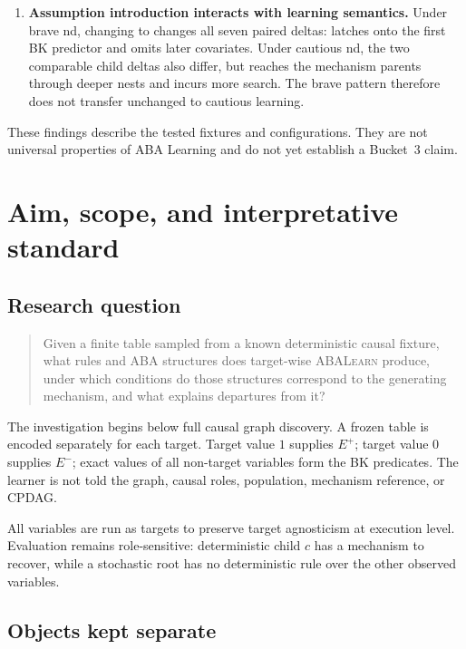\documentclass[11pt]{article}
\DeclareRobustCommand{\code}[1]{\texttt{\detokenize{#1}}}
\newcommand{\ABALearn}{\textsc{ABALearn}}
\newcommand{\Epos}{E^{+}}
\newcommand{\Eneg}{E^{-}}
\begin{document}
\begin{enumerate}
  \item \textbf{Assumption introduction interacts with learning semantics.}
  Under brave nd, changing \code{relto} to \code{sechk} changes all seven
  paired deltas: \code{sechk} latches onto the first BK predictor and omits
  later covariates. Under cautious nd, the two comparable child deltas also
  differ, but \code{sechk} reaches the mechanism parents through deeper nests
  and incurs more search. The brave pattern therefore does not transfer
  unchanged to cautious learning.
\end{enumerate}

These findings describe the tested fixtures and configurations. They are not
universal properties of ABA Learning and do not yet establish a Bucket~3
claim.

\section{Aim, scope, and interpretative standard}

\subsection{Research question}

\begin{quote}
Given a finite table sampled from a known deterministic causal fixture, what
rules and ABA structures does target-wise \ABALearn{} produce, under which
conditions do those structures correspond to the generating mechanism, and
what explains departures from it?
\end{quote}

The investigation begins below full causal graph discovery. A frozen table is
encoded separately for each target. Target value \(1\) supplies \(\Epos\);
target value \(0\) supplies \(\Eneg\); exact values of all non-target variables
form the BK predicates. The learner is not told the graph, causal roles,
population, mechanism reference, or CPDAG.

All variables are run as targets to preserve target agnosticism at execution
level. Evaluation remains role-sensitive: deterministic child \(c\) has a
mechanism to recover, while a stochastic root has no deterministic rule over
the other observed variables.

\subsection{Objects kept separate}
\end{document}
